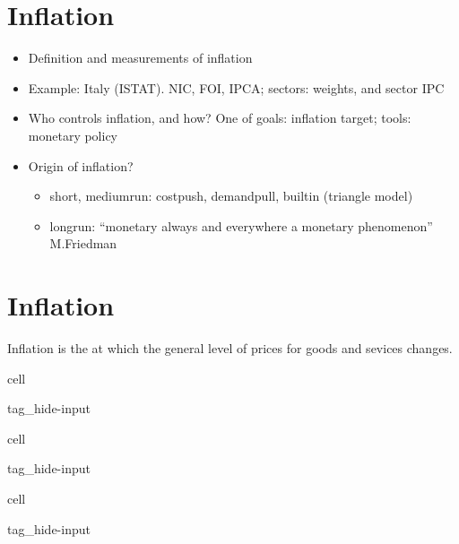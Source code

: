 \documentclass[letterpaper,10pt,english]{jupyterBook}
\begin{document}
\chapter{Inflation}
\label{\detokenize{ch/inflation:inflation}}\label{\detokenize{ch/inflation:fin-edu-inflation}}\label{\detokenize{ch/inflation::doc}}\begin{itemize}
\item {} 
\sphinxAtStartPar
Definition and measurements of inflation

\item {} 
\sphinxAtStartPar
Example: Italy (ISTAT). NIC, FOI, IPCA; sectors: weights, and sector IPC

\item {} 
\sphinxAtStartPar
Who controls inflation, and how? One of {\hyperref[\detokenize{ch/actors:fin-edu-actors-banks-cb}]{}} goals: inflation target; tools: monetary policy

\item {} 
\sphinxAtStartPar
Origin of inflation?
\begin{itemize}
\item {} 
\sphinxAtStartPar
short\sphinxhyphen{}, medium\sphinxhyphen{}run: cost\sphinxhyphen{}push, demand\sphinxhyphen{}pull, built\sphinxhyphen{}in (triangle model)

\item {} 
\sphinxAtStartPar
long\sphinxhyphen{}run: “monetary always and everywhere a monetary phenomenon” M.Friedman

\end{itemize}

\end{itemize}

\sphinxstepscope


\chapter{Inflation}
\label{\detokenize{code/notebooks/inflation:inflation}}\label{\detokenize{code/notebooks/inflation:fin-edu-inflation}}\label{\detokenize{code/notebooks/inflation::doc}}
\sphinxAtStartPar
Inflation is the  at which the general level of prices for goods and sevices changes.

\begin{sphinxuseclass}{cell}
\begin{sphinxuseclass}{tag_hide-input}
\end{sphinxuseclass}
\end{sphinxuseclass}
\begin{sphinxuseclass}{cell}
\begin{sphinxuseclass}{tag_hide-input}
\end{sphinxuseclass}
\end{sphinxuseclass}
\begin{sphinxuseclass}{cell}
\begin{sphinxuseclass}{tag_hide-input}
\end{sphinxuseclass}
\end{sphinxuseclass}
\end{document}
